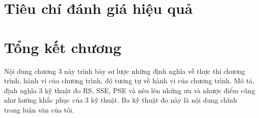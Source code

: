 \section{Tiêu chí đánh giá hiệu quả}

\section*{Tổng kết chương}
Nội dung chương 3 này trình bày sơ lược những định nghĩa về thực thi chương trình, hành vi của chương trình, độ tương tự về hành vi của chương trình. Mô tả, định nghĩa 3 kỹ thuật đo RS, SSE, PSE và nêu lên những ưu và nhược điểm cũng như hướng khắc phục của 3 kỹ thuật. Ba kỹ thuật đo này là nội dung chính trong luận văn của tôi.